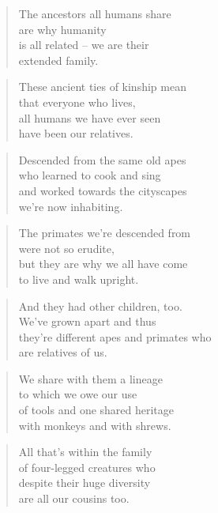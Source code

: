 \documentclass[10pt,a4paper]{article}
\begin{document}
\begin{multicols}{2}
\begin{verse}
The ancestors all humans share\\
are why humanity\\
is all related – we are their\\
extended family.
\end{verse}

\begin{verse}
These ancient ties of kinship mean\\
that everyone who lives,\\
all humans we have ever seen\\
have been our relatives.
\end{verse}

\begin{verse}
Descended from the same old apes\\
who learned to cook and sing\\
and worked towards the cityscapes\\
we’re now inhabiting.
\end{verse}

\begin{verse}
The primates we’re descended from\\
were not so erudite,\\
but they are why we all have come\\
to live and walk upright.
\end{verse}

\begin{verse}
And they had other children, too.\\
We’ve grown apart and thus\\
they’re different apes and primates who\\
are relatives of us.
\end{verse}

\begin{verse}
We share with them a lineage\\
to which we owe our use\\
of tools and one shared heritage\\
with monkeys and with shrews.
\end{verse}

\begin{verse}
All that’s within the family\\
of four-legged creatures who\\
despite their huge diversity\\
are all our cousins too.
\end{verse}


\end{multicols}
\end{document}
